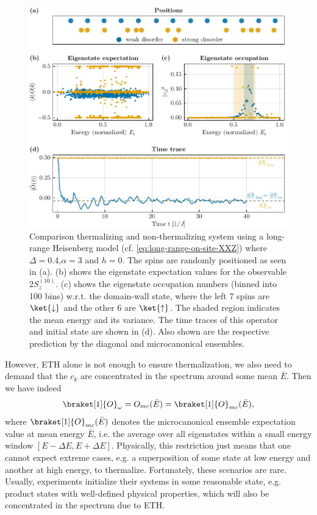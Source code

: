 \begin{figure}[htb!]
	\centering
	\includegraphics{gfx/part1/ETH-thermalization}
	\caption{Comparison thermalizing and non-thermalizing system using a long-range Heisenberg model (cf. \autoref{eq:long-range-on-site-XXZ}) where $\Delta=0.4$,$\alpha=3$ and $h=0$. The spins are randomly positioned as seen in (a). (b) shows the eigenstate expectation values for the observable $2S_z^{(10)}$. (c) shows the eigenstate occupation numbers (binned into 100 bins) w.r.t. the domain-wall state, where the left 7 spins are $\ket{\downarrow}$ and the other 6 are $\ket{\uparrow}$. The shaded region indicates the mean energy and its variance. The time traces of this operator and initial state are shown in (d). Also shown are the respective prediction by the diagonal and microcanonical ensembles.}
	\label{fig:ETH-thermalization}
\end{figure}

However, ETH alone is not enough to ensure thermalization, we also need to demand that the $c_k$ are concentrated in the spectrum around some mean $\bar{E}$. Then we have indeed
\begin{align}
	\braket[1]{O}_{\omega} = O_{mc}(\bar{E}) = \braket[1]{O}_{mc}(\bar{E}),
\end{align}
where $\braket[1]{O}_{mc}(\bar{E})$ denotes the microcanonical ensemble expectation value at mean energy $\bar{E}$, i.e. the average over all eigenstates within a small energy window $[E-\Delta E, E+\Delta E]$. Physically, this restriction just means that one cannot expect extreme cases, e.g. a superposition of some state at low energy and another at high energy, to thermalize. Fortunately, these scenarios are rare. Usually, experiments initialize their systems in some reasonable state, e.g. product states with well-defined physical properties, which will also be concentrated in the spectrum due to ETH. 

